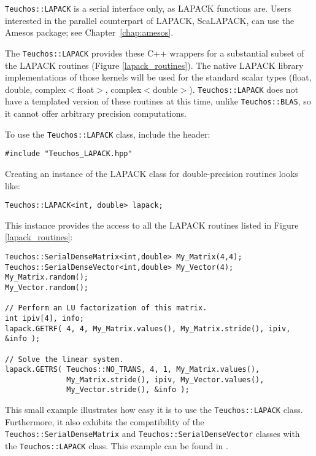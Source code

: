 \verb!Teuchos::LAPACK! is a serial interface only, as LAPACK functions
are. Users interested in the parallel counterpart of LAPACK, ScaLAPACK,
can use the Amesos package; see Chapter~\ref{chap:amesos}.

The \verb!Teuchos::LAPACK! provides these C++ wrappers for a substantial subset of the 
LAPACK routines (Figure \ref{lapack_routines}).
The native LAPACK library implementations of those kernels
will be used for the standard scalar types (float, double, complex$<$float$>$, complex$<$double$>$).  
\verb!Teuchos::LAPACK! does not have a templated version of these routines at this time, unlike
\verb!Teuchos::BLAS!, so it cannot offer arbitrary precision computations.

To use the \verb!Teuchos::LAPACK! class, include the header:
{\small 
\begin{verbatim}
#include "Teuchos_LAPACK.hpp"
\end{verbatim}}
Creating an instance of the LAPACK class for double-precision routines looks like:
{\small 
\begin{verbatim}
Teuchos::LAPACK<int, double> lapack;
\end{verbatim}}
This instance provides the access to all the LAPACK routines listed in Figure \ref{lapack_routines}:
{\small
\begin{verbatim}
Teuchos::SerialDenseMatrix<int,double> My_Matrix(4,4);
Teuchos::SerialDenseVector<int,double> My_Vector(4);
My_Matrix.random();
My_Vector.random();

// Perform an LU factorization of this matrix. 
int ipiv[4], info;
lapack.GETRF( 4, 4, My_Matrix.values(), My_Matrix.stride(), ipiv, &info ); 

// Solve the linear system.
lapack.GETRS( Teuchos::NO_TRANS, 4, 1, My_Matrix.values(), 
              My_Matrix.stride(), ipiv, My_Vector.values(), 
              My_Vector.stride(), &info );
\end{verbatim}}

This small example illustrates how easy it is to use the {\tt Teuchos::LAPACK}
class.  Furthermore, it also exhibits the compatibility of the {\tt Teuchos::SerialDenseMatrix} 
and {\tt Teuchos::SerialDenseVector} classes with the {\tt Teuchos::LAPACK} class.  
This example can be found in .  


